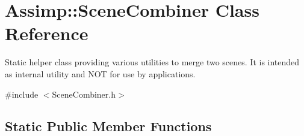 \hypertarget{class_assimp_1_1_scene_combiner}{\section{Assimp\+:\+:Scene\+Combiner Class Reference}
\label{class_assimp_1_1_scene_combiner}
}


Static helper class providing various utilities to merge two scenes. It is intended as internal utility and N\+O\+T for use by applications.  




{\ttfamily \#include $<$Scene\+Combiner.\+h$>$}

\subsection*{Static Public Member Functions}

